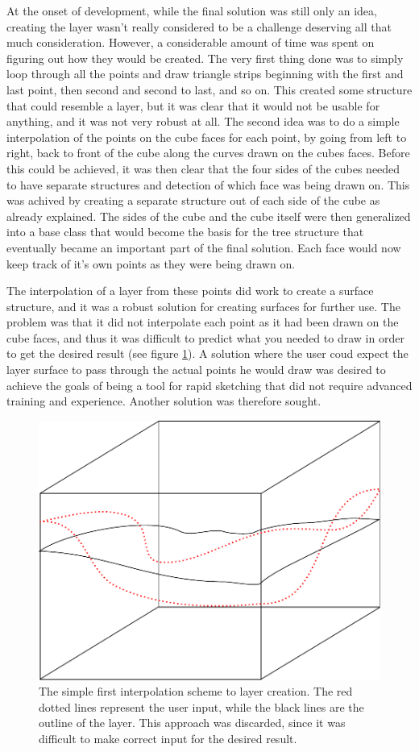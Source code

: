 \documentclass[a4paper,12pt]{report}
\begin{document}
\label{subsec:layers}
At the onset of development, while the final solution was still only an idea, creating the layer wasn't really considered to be a challenge deserving all that much consideration. However, a considerable amount of time was spent on figuring out how they would be created. The very first thing done was to simply loop through all the points and draw triangle strips beginning with the first and last point, then second and second to last, and so on. This created some structure that could resemble a layer, but it was clear that it would not be usable for anything, and it was not very robust at all. The second idea was to do a simple interpolation of the points on the cube faces for each point, by going from left to right, back to front of the cube along the curves drawn on the cubes faces. Before this could be achieved, it was then clear that the four sides of the cubes needed to have separate structures and detection of which face was being drawn on. This was achived by creating a separate structure out of each 
side of the cube as already explained. The sides of the cube and the cube itself were then generalized into a base class that would become the basis for the tree structure that eventually became an important part of the final solution. Each face would now keep track of it's own points as they were being drawn on.

The interpolation of a layer from these points did work to create a surface structure, and it was a robust solution for creating surfaces for further use. The problem was that it did not interpolate each point as it had been drawn on the cube faces, and thus it was difficult to predict what you needed to draw in order to get the desired result (see figure \ref{fig:layerSimpleInterpol}). A solution where the user coud expect the layer surface to pass through the actual points he would draw was desired to achieve the goals of being a tool for rapid sketching that did not require advanced training and experience. Another solution was therefore sought.

\begin{figure}
 \centering
\includegraphics[width=.75\linewidth]{thesis/layerSimpleInterpol.pdf}
 \caption{The simple first interpolation scheme to layer creation. The red dotted lines represent the user input, while the black lines are the outline of the layer. This approach was discarded, since it was difficult to make correct input for the desired result.}
 \label{fig:layerSimpleInterpol}
\end{figure}
\end{document}
